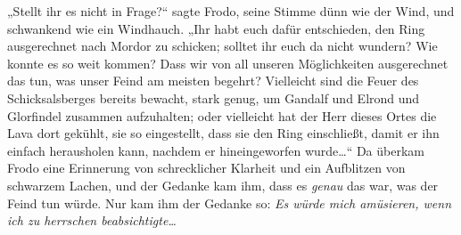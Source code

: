 „Stellt ihr es nicht in Frage?“ sagte Frodo, seine Stimme dünn wie der Wind, und schwankend wie ein Windhauch.
„Ihr habt euch dafür entschieden, den Ring ausgerechnet nach Mordor zu schicken; solltet ihr euch da nicht wundern? Wie konnte es so weit kommen? Dass wir von all unseren Möglichkeiten ausgerechnet das tun, was unser Feind am meisten begehrt? Vielleicht sind die Feuer des Schicksalsberges bereits bewacht, stark genug, um Gandalf und Elrond und Glorfindel zusammen aufzuhalten; oder vielleicht hat der Herr dieses Ortes die Lava dort gekühlt, sie so eingestellt, dass sie den Ring einschließt, damit er ihn einfach herausholen kann, nachdem er hineingeworfen wurde…“ Da überkam Frodo eine Erinnerung von schrecklicher Klarheit und ein Aufblitzen von schwarzem Lachen, und der Gedanke kam ihm, dass es \emph{genau} das war, was der Feind tun würde. Nur kam ihm der Gedanke so: \emph{Es würde mich amüsieren, wenn ich zu herrschen beabsichtigte…}

